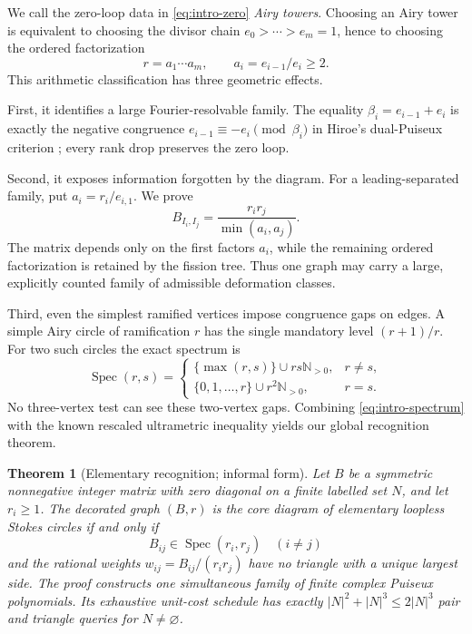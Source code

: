 \documentclass[11pt,a4paper]{amsart}
\theoremstyle{plain}
\newtheorem{theorem}{Theorem}[section]
\theoremstyle{definition}
\newcommand{\NN}{\mathbb N}
\newcommand{\Spec}{\operatorname{Spec}}
\begin{document}
We call the zero-loop data in \eqref{eq:intro-zero} \emph{Airy towers}.  Choosing an Airy tower is
equivalent to choosing the divisor chain $e_0>\cdots>e_m=1$, hence to choosing the ordered
factorization
\[
  r=a_1\cdots a_m,\qquad a_i=e_{i-1}/e_i\ge2.
\]
This arithmetic classification has three geometric effects.

First, it identifies a large Fourier-resolvable family.  The equality
$\beta_i=e_{i-1}+e_i$ is exactly the negative congruence
$e_{i-1}\equiv-e_i\pmod{\beta_i}$ in Hiroe's dual-Puiseux criterion
\cite{Hiroe2017}; every rank drop preserves the zero loop.

Second, it exposes information forgotten by the diagram.  For a leading-separated family, put
$a_i=r_i/e_{i,1}$.  We prove
\begin{equation}\label{eq:intro-separated}
  B_{I_i,I_j}=\frac{r_ir_j}{\min(a_i,a_j)}.
\end{equation}
The matrix depends only on the first factors $a_i$, while the remaining ordered factorization is
retained by the fission tree.  Thus one graph may carry a large, explicitly counted family of
admissible deformation classes.

Third, even the simplest ramified vertices impose congruence gaps on edges.  A simple Airy circle
of ramification $r$ has the single mandatory level $(r+1)/r$.  For two such circles the exact
spectrum is
\begin{equation}\label{eq:intro-spectrum}
 \Spec(r,s)=
 \begin{cases}
   \{\max(r,s)\}\cup rs\NN_{>0},&r\ne s,\\
   \{0,1,\ldots,r\}\cup r^2\NN_{>0},&r=s.
 \end{cases}
\end{equation}
No three-vertex test can see these two-vertex gaps.  Combining \eqref{eq:intro-spectrum} with the
known rescaled ultrametric inequality yields our global recognition theorem.

\begin{theorem}[Elementary recognition; informal form]\label{thm:intro-recognition}
Let $B$ be a symmetric nonnegative integer matrix with zero diagonal on a finite labelled set $N$,
and let $r_i\ge1$.  The decorated graph $(B,r)$ is the core diagram of elementary loopless Stokes
circles if and only if
\[
 B_{ij}\in\Spec(r_i,r_j)\quad(i\ne j)
\]
and the rational weights $w_{ij}=B_{ij}/(r_ir_j)$ have no triangle with a unique largest side.
The proof constructs one simultaneous family of finite complex Puiseux polynomials.  Its exhaustive
unit-cost schedule has exactly $|N|^2+|N|^3\le2|N|^3$ pair and triangle queries for $N\ne\varnothing$.
\end{theorem}
\end{document}
